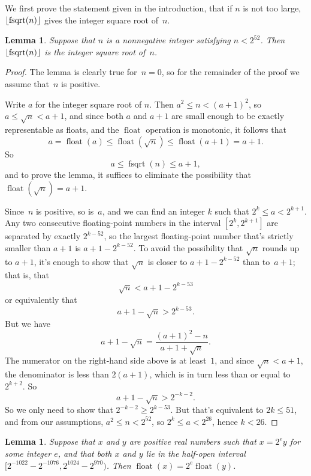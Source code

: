 \documentclass[a4paper]{article}
\DeclarePairedDelimiter\floor{\lfloor}{\rfloor}
\DeclareMathOperator{\fsqrt}{fsqrt}
\DeclareMathOperator{\float}{float}
\theoremstyle{plain}
\newtheorem{lemma}[theorem]{Lemma}
\theoremstyle{definition}
\begin{document}
We first prove the statement given in the introduction, that if $n$ is
not too large, $\floor{\fsqrt(n)}$ gives the integer square root of~$n$.

\begin{lemma}
  Suppose that $n$ is a nonnegative integer satisfying $n < 2^{52}$. Then
  $\floor{\fsqrt(n)}$ is the integer square root of~$n$.
\end{lemma}

\begin{proof}
  The lemma is clearly true for~$n=0$, so for the remainder of the proof
  we assume that~$n$ is positive.

  Write $a$ for the integer square root of $n$. Then $a^2 \le n < (a + 1)^2$,
  so $a \le \sqrt n < a + 1$, and since both $a$ and $a + 1$ are small
  enough to be exactly representable as floats, and the $\float$ operation
  is monotonic, it follows that
  $$a = \float(a) \le \float(\sqrt n) \le \float(a + 1) = a + 1.$$
  So
  $$a \le \fsqrt(n) \le a + 1,$$
  and to prove the lemma, it suffices to eliminate
  the possibility that~$\float(\sqrt n) = a + 1$.

  Since~$n$ is positive, so is~$a$, and we can find an integer $k$ such that
  $2^k \le a < 2^{k + 1}$. Any two consecutive floating-point numbers in the
  interval $[2^k, 2^{k+1}]$ are separated by exactly $2^{k-52}$, so the largest
  floating-point number that's strictly smaller than $a + 1$ is $a + 1 - 2^{k -
  52}.$ To avoid the possibility that $\sqrt n$ rounds up to $a + 1$, it's
  enough to show that $\sqrt n$ is closer to $a + 1 - 2^{k-52}$ than to~$a +
  1$; that is, that
  $$\sqrt n < a + 1 - 2^{k-53}$$
  or equivalently that
  $$a + 1 - \sqrt n > 2^{k - 53}.$$
  But we have
  $$a + 1 - \sqrt n = \frac{(a + 1)^2 - n}{a + 1 + \sqrt n}.$$
  The numerator on the right-hand side above is at least~$1$, and since $\sqrt
  n < a + 1$, the denominator is less than $2(a+1)$, which is in turn less than
  or equal to $2^{k+2}$. So
  $$a + 1 - \sqrt n > 2^{-k-2}.$$ So we only need to show that $2^{-k-2} \ge
  2^{k-53}$. But that's equivalent to $2k \le 51$, and from our assumptions,
  $a^2 \le n < 2^{52}$, so $2^k \le a < 2^{26}$, hence $k < 26$.
\end{proof}


\begin{lemma}\label{float_scale}
  Suppose that $x$ and $y$ are positive real numbers such that $x = 2^e y$ for
  some integer $e$, and that both $x$ and $y$ lie in the half-open interval
  $[2^{-1022} - 2^{-1076}, 2^{1024} - 2^{970})$. Then $\float(x) = 2^e
  \float(y)$.
\end{lemma}
\end{document}
